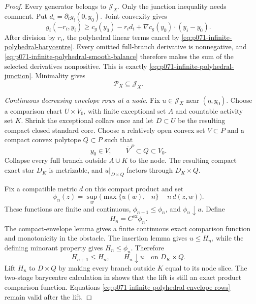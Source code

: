 \begin{proof}
Every generator belongs to \(\mathcal J_X\).  Only the junction inequality
needs comment.  Put \(d_i=\partial_tg_i(0,y_0)\).  Joint convexity gives
\[
 g_i(-r_i,y_i)\geq
 c_g(y_0)-r_id_i+
 \nabla c_g(y_0)\mathbin\cdot(y_i-y_0).
\]
After division by \(r_i\), the polyhedral linear terms cancel by
\eqref{eq:p071-infinite-polyhedral-barycentre}.  Every omitted full-branch
derivative is nonnegative, and
\eqref{eq:p071-infinite-polyhedral-smooth-balance} therefore makes the sum
of the selected derivatives nonpositive.  This is exactly
\eqref{eq:p071-infinite-polyhedral-junction}.  Minimality gives
\begin{equation}
                           \mathcal P_X\subseteq\mathcal J_X.
 \label{eq:p071-infinite-polyhedral-easy-inclusion}
\end{equation}

\medskip\noindent
\emph{Continuous decreasing envelope rows at a node.}
Fix \(u\in\mathcal J_X\) near \((\eta,y_0)\).  Choose a comparison chart
\(U\times V_0\), with finite exceptional set \(A\) and countable activity
set \(K\).  Shrink the exceptional collars once and let \(D\subset U\) be
the resulting compact closed standard core.  Choose a relatively open
convex set \(V\subset P\) and a compact convex polytope \(Q\subset P\) such
that
\[
            y_0\in V,\qquad
            \overline V^{\,P}\subset Q\subset V_0.
\]
Collapse every full branch outside \(A\cup K\) to the node.  The resulting
compact exact star \(D_K\) is metrizable, and \(u|_{D\times Q}\) factors
through \(D_K\times Q\).

Fix a compatible metric \(d\) on this compact product and set
\begin{equation}
 \phi_n(z)=\sup_w
   \bigl(\max\{u(w),-n\}-n\,d(z,w)\bigr).
 \label{eq:p071-infinite-polyhedral-upper-regularization}
\end{equation}
These functions are finite and continuous,
\(\phi_{n+1}\leq\phi_n\), and \(\phi_n\downarrow u\).  Define
\[
                         H_n=C^{\mathrm{ex}}\phi_n.
\]
The compact-envelope lemma gives a finite continuous exact comparison
function and monotonicity in the obstacle.  The insertion lemma gives
\(u\leq H_n\), while the defining minorant property gives
\(H_n\leq\phi_n\).  Therefore
\begin{equation}
             H_{n+1}\leq H_n,\qquad H_n\downarrow u
             \quad\text{on }D_K\times Q.
 \label{eq:p071-infinite-polyhedral-envelope-rows}
\end{equation}
Lift \(H_n\) to \(D\times Q\) by making every branch outside \(K\) equal
to its node slice.  The two-stage barycentre calculation in
 shows that the
lift is still an exact product comparison function.  Equations
\eqref{eq:p071-infinite-polyhedral-envelope-rows} remain valid after the
lift.


\end{proof}
